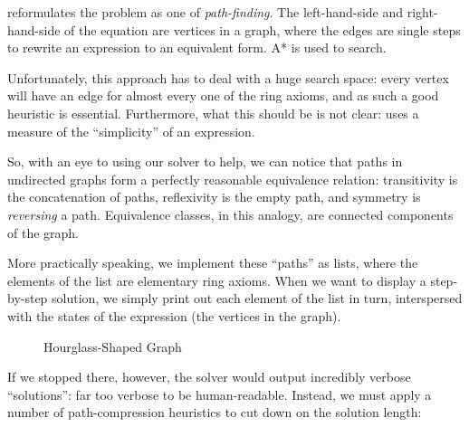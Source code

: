 \documentclass[acmsmall,review,anonymous]{acmart}\settopmatter{printfolios=true,printccs=false,printacmref=false}
\theoremstyle{remark}
\begin{document}
\citet{lioubartsev_constructing_2016} reformulates the problem as one of
\emph{path-finding}. The left-hand-side and right-hand-side of the equation are
vertices in a graph, where the edges are single steps to rewrite an expression
to an equivalent form. A* is used to search.

Unfortunately, this approach has to deal with a huge search space: every vertex
will have an edge for almost every one of the ring axioms, and as such a good
heuristic is essential. Furthermore, what this should be is not clear:
\citet{lioubartsev_constructing_2016} uses a measure of the ``simplicity'' of an
expression.

So, with an eye to using our solver to help, we can notice that paths in
undirected graphs form a perfectly reasonable equivalence relation: transitivity
is the concatenation of paths, reflexivity is the empty path, and symmetry is
\emph{reversing} a path. Equivalence classes, in this analogy, are connected
components of the graph.

More practically speaking, we implement these ``paths'' as lists, where the
elements of the list are elementary ring axioms. When we want to display a
step-by-step solution, we simply print out each element of the list in turn,
interspersed with the states of the expression (the vertices in the graph).
\begin{multicols}{2}
\end{multicols}
\begin{figure}
  \centering
   \caption{Hourglass-Shaped Graph}
  \label{h-graph}
\end{figure}
If we stopped there, however, the solver would output incredibly verbose
``solutions'': far too verbose to be human-readable. Instead, we must apply a
number of path-compression heuristics to cut down on the solution length:
\end{document}
